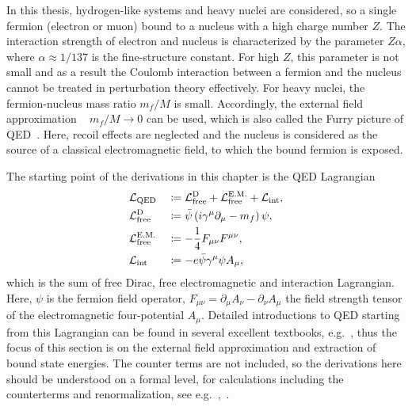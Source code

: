 In this thesis, hydrogen-like systems and heavy nuclei are considered, so a single fermion (electron or muon) bound to a nucleus with a high charge number $Z$. The interaction strength of electron and nucleus is characterized by the parameter $Z\alpha$, where $\alpha \approx 1/137$ is the fine-structure constant. For high $Z$, this parameter is not small and as a result the Coulomb interaction between a fermion and the nucleus cannot be treated in perturbation theory effectively. 
For heavy nuclei, the fermion-nucleus mass ratio $m_f/M$ is small. Accordingly, the external field approximation ~\cite[\mbox{Section~13.6}]{weinberg2005} $m_f/M \rightarrow 0$ can be used, which is also called the Furry picture of QED~\cite{furry1951}. Here, recoil effects are neglected and the nucleus is considered as the source of a classical electromagnetic field, to which the bound fermion is exposed.

The starting point of the derivations in this chapter is the QED Lagrangian 
\begin{alignat}{2}
\label{eq:Lqed}
&\mathcal{L}_{\text{QED}}&&\coloneqq \mathcal{L}_{\text{free}}^{\text{D}} + \mathcal{L}_{\text{free}}^{\text{E.M.}} + \mathcal{L}_{\text{int}}, \\
&\mathcal{L}_{\text{free}}^{\text{D}} &&\coloneqq\bar{\psi}\left( i \gamma^\mu \partial_\mu -m_f \right)\psi,\\ 
&\mathcal{L}_{\text{free}}^{\text{E.M.}} &&\coloneqq -\frac{1}{4}F_{\mu\nu}F^{\mu\nu},\\
&\mathcal{L}_{\text{int}}&&\coloneqq -e\bar{\psi}\gamma^\mu \psi A_\mu,\notag
\end{alignat}
which is the sum of free Dirac, free electromagnetic and interaction Lagrangian. Here, $\psi$ is the fermion field operator, $F_{\mu\nu}=\partial_\mu A_\nu - \partial_\nu A_\mu$ the field strength tensor of the electromagnetic four-potential $A_\mu$. Detailed introductions to QED starting from this Lagrangian can be found in several excellent textbooks, e.g.~\cite{weinberg2005,itzykson2005,peskin1995}, thus the focus of this section is on the external field approximation and extraction of bound state energies. The counter terms are not included, so the derivations here should be understood on a formal level, for calculations including the counterterms and renormalization, see \mbox{e.g.~\cite[Section 14]{weinberg2005},~\cite{shabaev2002_2}.}

